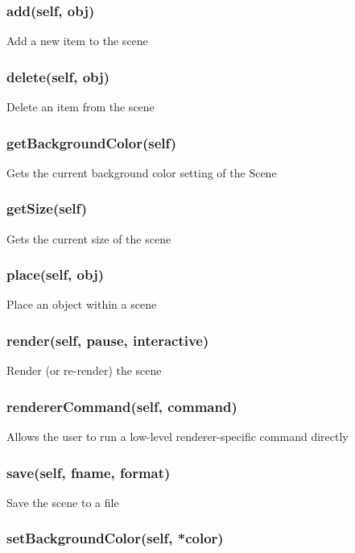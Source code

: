 \subsubsection{add(self, obj)}

Add a new item to the scene

\subsubsection{delete(self, obj)}

Delete an item from the scene

\subsubsection{getBackgroundColor(self)}

Gets the current background color setting of the Scene

\subsubsection{getSize(self)}

Gets the current size of the scene

\subsubsection{place(self, obj)}

Place an object within a scene

\subsubsection{render(self, pause, interactive)}

Render (or re-render) the scene

\subsubsection{rendererCommand(self, command)}

Allows the user to run a low-level renderer-specific command directly

\subsubsection{save(self, fname, format)}

Save the scene to a file

\subsubsection{setBackgroundColor(self, *color)}

